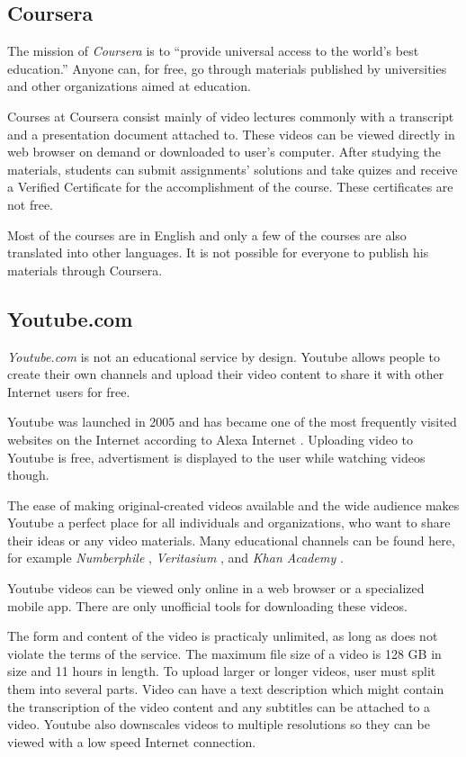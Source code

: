 \subsection{Coursera}
The mission of \textit{Coursera} is to ``provide universal access to the world’s best education.'' \cite{9} Anyone can, for free, go through materials published by universities and other organizations aimed at education.

Courses at Coursera consist mainly of video lectures commonly with a transcript and a presentation document attached to. These videos can be viewed directly in web browser on demand or downloaded to user's computer. After studying the materials, students can submit assignments' solutions and take quizes and receive a Verified Certificate for the accomplishment of the course. These certificates are not free.

Most of the courses are in English and only a few of the courses are also translated into other languages. It is not possible for everyone to publish his materials through Coursera.

\subsection{Youtube.com}
\textit{Youtube.com} \cite{10} is not an educational service by design. Youtube allows people to create their own channels and upload their video content to share it with other Internet users for free.

Youtube was launched in 2005 and has became one of the most frequently visited websites on the Internet according to Alexa Internet \cite{11}. Uploading video to Youtube is free, advertisment is displayed to the user while watching videos though.

The ease of making original-created videos available and the wide audience makes Youtube a perfect place for all individuals and organizations, who want to share their ideas or any video materials. Many educational channels can be found here, for example \textit{Numberphile} \cite{numberphile_youtube}, \textit{Veritasium} \cite{veritasium_online}, and \textit{Khan Academy} \cite{khan_academy_youtube}.

Youtube videos can be viewed only online in a web browser or a specialized mobile app. There are only unofficial tools for downloading these videos.

The form and content of the video is practicaly unlimited, as long as does not violate the terms of the service. The maximum file size of a video is 128 GB in size and 11 hours in length. To upload larger or longer videos, user must split them into several parts. Video can have a text description which might contain the transcription of the video content and any subtitles can be attached to a video. Youtube also downscales videos to multiple resolutions so they can be viewed with a low speed Internet connection.



